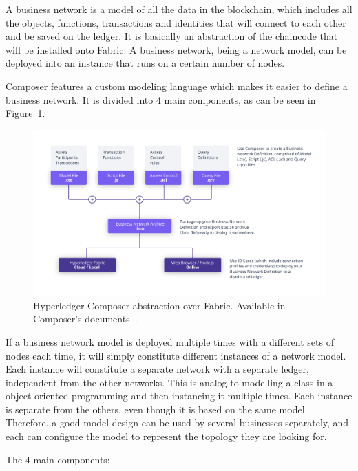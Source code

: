 A business network is a model of all the data in the blockchain, which includes all the objects, functions, transactions and identities that will connect to each other and be saved on the ledger. It is basically an abstraction of the chaincode that will be installed onto Fabric. A business network, being a network model, can be deployed into an instance that runs on a certain number of nodes.

Composer features a custom modeling language which makes it easier to define a business network. It is divided into 4 main components, as can be seen in Figure~\ref{fig:composer_abstraction}.

\begin{figure}[h]
\centering
\includegraphics[scale=0.40]{media/Composer-Diagram.png}
\caption[Hyperledger Composer abstraction over Fabric]{Hyperledger Composer abstraction over Fabric. Available in Composer's documents~\cite{ComposerIntro}.}
\label{fig:composer_abstraction}
\end{figure}

If a business network model is deployed multiple times with a different sets of nodes each time, it will simply constitute different instances of a network model. Each instance will constitute a separate network with a separate ledger, independent from the other networks. This is analog to modelling a class in a object oriented programming and then instancing it multiple times. Each instance is separate from the others, even though it is based on the same model. Therefore, a good model design can be used by several businesses separately, and each can configure the model to represent the topology they are looking for.

The 4 main components: 

